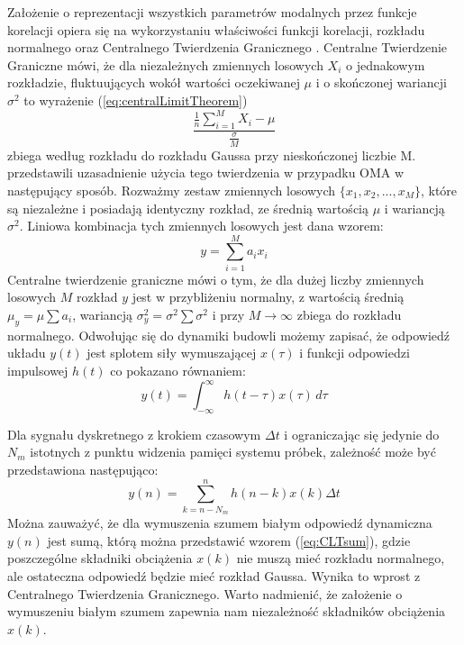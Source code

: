 Założenie o reprezentacji wszystkich parametrów modalnych przez funkcje korelacji opiera się na wykorzystaniu właściwości funkcji korelacji, rozkładu normalnego oraz Centralnego Twierdzenia Granicznego . Centralne Twierdzenie Graniczne mówi, że dla niezależnych zmiennych losowych $X_i$ o jednakowym rozkładzie, fluktuujących wokół wartości oczekiwanej $\mu$ i o skończonej wariancji $\sigma^2$ to wyrażenie (\ref{eq:centralLimitTheorem})
\begin{equation} \label{eq:centralLimitTheorem}
	\frac{\frac{1}{n}\sum_{i=1}^{M} X_i - \mu}{\frac{\sigma}{M}}
\end{equation}
zbiega według rozkładu do rozkładu Gaussa przy nieskończonej liczbie M.
\cite{Brincker2015} przedstawili uzasadnienie użycia tego twierdzenia w przypadku OMA w następujący sposób. Rozważmy zestaw zmiennych losowych $\{x_1,x_2,...,x_M\}$, które są niezależne i posiadają identyczny rozkład, ze średnią wartością $\mu$ i wariancją $\sigma^2$. Liniowa kombinacja tych zmiennych losowych jest dana wzorem:
\begin{equation} \label{eq:CLTsum}
	y = \sum_{i=1}^{M} a_i x_i
\end{equation}
Centralne twierdzenie graniczne mówi o tym, że dla dużej liczby zmiennych losowych $M$ rozkład $y$ jest w przybliżeniu normalny, z wartością średnią $\mu_y=\mu\sum a_i$, wariancją $\sigma_y^2=\sigma^2\sum \sigma^2$ i przy $M \xrightarrow{} \infty$ zbiega do rozkładu normalnego. Odwołując się do dynamiki budowli możemy zapisać, że odpowiedź układu $y(t)$ jest splotem siły wymuszającej $x(\tau)$ i funkcji odpowiedzi impulsowej $h(t)$ co pokazano równaniem:
\begin{equation} \label{eq:convolutionResponse}
	y(t)=\int_{-\infty}^{\infty}h(t-\tau)x(\tau) \,d\tau
\end{equation}

Dla sygnału dyskretnego z krokiem czasowym $\Delta t$ i ograniczając się jedynie do $N_m$ istotnych z punktu widzenia pamięci systemu próbek, zależność może być przedstawiona następująco:
\begin{equation}
	y(n) = \sum_{k=n-N_m}^{n} h(n-k)x(k)\Delta t
\end{equation}
Można zauważyć, że dla wymuszenia szumem białym odpowiedź dynamiczna $y(n)$ jest sumą, którą można przedstawić wzorem (\ref{eq:CLTsum}), gdzie poszczególne składniki obciążenia $x(k)$ nie muszą mieć rozkładu normalnego, ale ostateczna odpowiedź będzie mieć rozkład Gaussa. Wynika to wprost z Centralnego Twierdzenia Granicznego. Warto nadmienić, że założenie o wymuszeniu białym szumem zapewnia nam niezależność składników obciążenia $x(k)$. 

